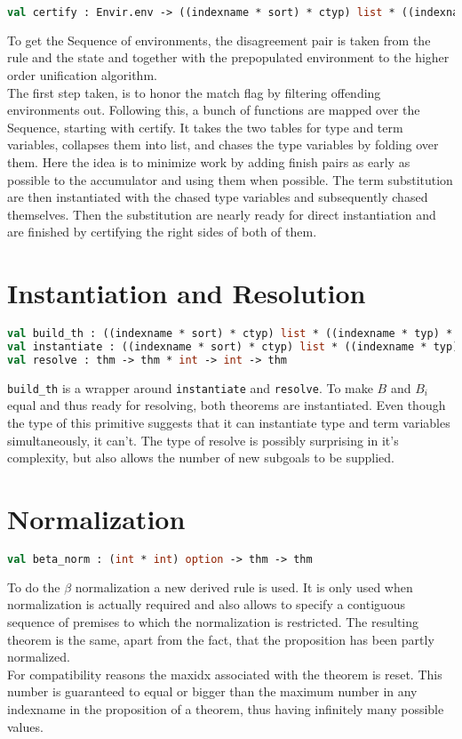 \begin{lstlisting}[language=ML,breaklines=true]
val certify : Envir.env -> ((indexname * sort) * ctyp) list * ((indexname * typ) * cterm) list
\end{lstlisting}

To get the Sequence of environments, the disagreement pair is taken from the rule and the state and together with the prepopulated environment to the higher order unification algorithm.\\
The first step taken, is to honor the match flag by filtering offending environments out. Following this, a bunch of functions are mapped over the Sequence, starting with certify. It takes the two tables for type and term variables, collapses them into list, and chases the type variables by folding over them. Here the idea is to minimize work by adding finish pairs as early as possible to the accumulator and using them when possible. The term substitution are then instantiated with the chased type variables and subsequently chased themselves. Then the substitution are nearly ready for direct instantiation and are finished by certifying the right sides of both of them.

\section{Instantiation and Resolution}

\begin{lstlisting}[language=ML,breaklines=true]
val build_th : ((indexname * sort) * ctyp) list * ((indexname * typ) * cterm) list -> thm
val instantiate : ((indexname * sort) * ctyp) list * ((indexname * typ) * cterm) list
val resolve : thm -> thm * int -> int -> thm
\end{lstlisting}

\texttt{build\_th} is a wrapper around \texttt{instantiate} and \texttt{resolve}. To make $B$ and $B_i$ equal and thus ready for resolving, both theorems are instantiated. Even though the type of this primitive suggests that it can instantiate type and term variables simultaneously, it can't. The type of resolve is possibly surprising in it's complexity, but also allows the number of new subgoals to be supplied.

\section{Normalization}

\begin{lstlisting}[language=ML,breaklines=true]
val beta_norm : (int * int) option -> thm -> thm
\end{lstlisting}

To do the $\beta$ normalization a new derived rule is used. It is only used when normalization is actually required and also allows to specify a contiguous sequence of premises to which the normalization is restricted. The resulting theorem is the same, apart from the fact, that the proposition has been partly normalized.\\
For compatibility reasons the maxidx associated with the theorem is reset. This number is guaranteed to equal or bigger than the maximum number in any indexname in the proposition of a theorem, thus having infinitely many possible values.